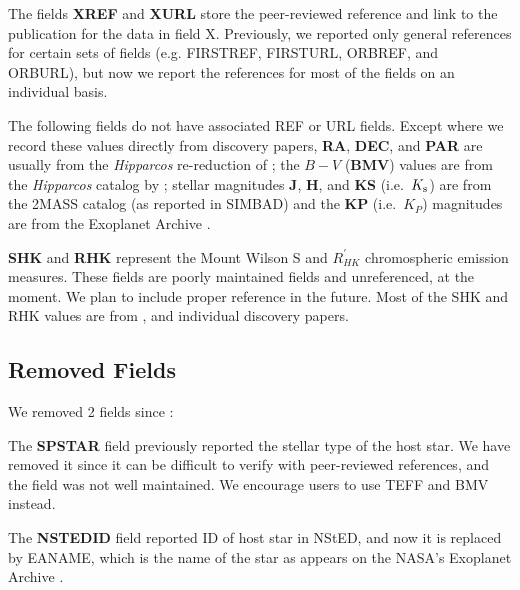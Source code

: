 \documentclass[11pt,preprint]{aastex}
\begin{document}
\begin{CJK*}{UTF8}{gbsn}
The fields {\bf XREF} and {\bf XURL} store the peer-reviewed reference
and link to the publication for the data in field X. Previously, we 
reported only general references for certain sets of fields (e.g. FIRSTREF,
FIRSTURL, ORBREF, and ORBURL), but now we report the references for
most of the fields on an individual basis.

The following fields do not have associated REF or URL fields. Except
where we record these values directly from discovery papers, {\bf RA},
{\bf DEC}, and {\bf PAR} are usually from the \textit{Hipparcos}
re-reduction of \cite{van Leeuwen2009}; the $B-V$ ({\bf BMV}) values
are from the \textit{Hipparcos} catalog by \cite{Perryman1997};
stellar magnitudes {\bf J}, {\bf H}, and {\bf KS} (i.e.\ $K_{\rm s}$)
are from the 2MASS catalog
\citep{Skrutskie2006} (as reported in SIMBAD) and the {\bf KP} (i.e.\ $K_P$) magnitudes are from the Exoplanet
Archive \citep{Akeson2013}.

{\bf SHK} and {\bf RHK} represent the Mount Wilson S and
$R^\prime_{HK}$ chromospheric
emission measures.  These fields are poorly maintained fields and
unreferenced, at the moment. We plan to include proper reference in
the future. Most of the SHK and RHK values are from \cite{Butler2006},
and individual discovery papers. 

\subsection{Removed Fields}\label{sec:removed}

We removed 2 fields since \cite{Wright2011}:

The {\bf SPSTAR} field previously reported the stellar type of the host
star.  We have removed it since it can be difficult to verify with
peer-reviewed references, and the field was not well maintained.  We encourage users
to use TEFF and BMV instead.

The {\bf NSTEDID} field reported ID of host star in NStED, and now it is
replaced by EANAME, which is the name of the star as appears on the
NASA's Exoplanet Archive \citep{Akeson2013}. 



\end{CJK*}
\end{document}

